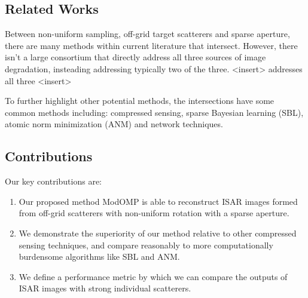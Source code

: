 \documentclass[journal]{IEEEtran}
\begin{document}
\subsection{Related Works}

%
Between non-uniform sampling, off-grid target scatterers and sparse aperture, there are many methods within current literature that intersect. However, there isn't a large consortium that directly address all three sources of image degradation, insteading addressing typically two of the three. <insert> addresses all three <insert>

To further highlight other potential methods, the intersections have some common methods including: compressed sensing, sparse Bayesian learning (SBL), atomic norm minimization (ANM) and network techniques.  

\subsection{Contributions}

Our key contributions are:

\begin{enumerate}
    \item Our proposed method ModOMP is able to reconstruct ISAR images formed from off-grid scatterers with non-uniform rotation with a sparse aperture.
    \item We demonstrate the superiority of our method relative to other compressed sensing techniques, and compare reasonably to more computationally burdensome algorithms like SBL and ANM.
    \item We define a performance metric by which we can compare the outputs of ISAR images with strong individual scatterers.
\end{enumerate}
\end{document}

